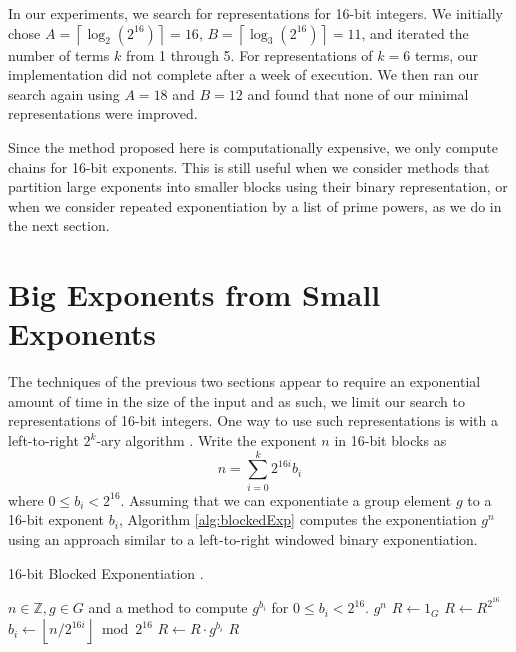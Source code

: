 \documentclass{ucalgthes1}
\theoremstyle{definition}
\newcommand{\ZZ}{\mathbb{Z}}
\newcommand{\floor}[1]{\left\lfloor #1 \right\rfloor}
\newcommand{\ceil}[1]{\left\lceil #1 \right\rceil}
\begin{document}
In our experiments, we search for representations for 16-bit integers. We initially chose $A = \ceil{\log_2\left(2^{16}\right)} = 16$, $B = \ceil{\log_3 \left(2^{16}\right)} = 11$, and iterated the number of terms $k$ from 1 through 5. For representations of $k = 6$ terms, our implementation did not complete after a week of execution.  We then ran our search again using $A=18$ and $B=12$ and found that none of our minimal representations were improved.

Since the method proposed here is computationally expensive, we only compute chains for 16-bit exponents.  This is still useful when we consider methods that partition large exponents into smaller blocks using their binary representation, or when we consider repeated exponentiation by a list of prime powers, as we do in the next section.


\section{Big Exponents from Small Exponents}
\label{sec:expBigFromSmall}

The techniques of the previous two sections appear to require an exponential amount of time in the size of the input and as such, we limit our search to representations of 16-bit integers.  One way to use such representations is with a left-to-right $2^k$-ary algorithm \mbox{\cite[\S 9.1.2]{Cohen2006}}.  Write the exponent $n$ in 16-bit blocks as
\[
	n = \sum_{i=0}^k 2^{16i} b_i
\]
where $0 \le b_i < 2^{16}$.  Assuming that we can exponentiate a group element $g$ to a 16-bit exponent $b_i$, Algorithm \ref{alg:blockedExp} computes the exponentiation $g^n$ using an approach similar to a left-to-right windowed binary exponentiation.

\begin{algorithm}[htb]
\caption{16-bit Blocked Exponentiation \cite[Algorithm 9.7]{Cohen2006}.}
\label{alg:blockedExp}
\begin{algorithmic}[1]
\Require $n \in \ZZ, g \in G$ and a method to compute $g^{b_i}$ for $0 \le b_i < 2^{16}$.
\Ensure $g^n$
\State $R \gets 1_G$
\For {$i$ from $\ceil{\log_{2^{16}} n}$ downto 0}
	\State $R \gets R^{2^{16}}$ 
	\State $b_i \gets \floor{n / 2^{16i}} \bmod {2^{16}}$
	\State $R \gets R \cdot g^{b_i}$ 
\EndFor
\State \Return $R$
\end{algorithmic}
\end{algorithm}
\end{document}
